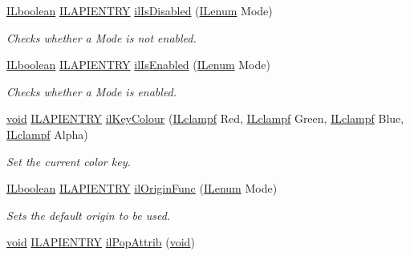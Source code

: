 \begin{DoxyCompactItemize}
\hyperlink{group__il__types_gaa6aa7c95cfdc06b4d8601ef832b7bb0a}{I\+Lboolean} \hyperlink{_i_l_8h_a69c08a8d06df986f7e46f209d131ef2f}{I\+L\+A\+P\+I\+E\+N\+T\+R\+Y} \hyperlink{group__state_ga6fdd0b1ac89f9a43bdb3be9a23cbe354}{il\+Is\+Disabled} (\hyperlink{group__il__types_ga62ca73445716183ef42b1f3906a45ed0}{I\+Lenum} Mode)
\begin{DoxyCompactList}\small\item\em Checks whether a {\itshape Mode} is not enabled. \end{DoxyCompactList}\item 
\hyperlink{group__il__types_gaa6aa7c95cfdc06b4d8601ef832b7bb0a}{I\+Lboolean} \hyperlink{_i_l_8h_a69c08a8d06df986f7e46f209d131ef2f}{I\+L\+A\+P\+I\+E\+N\+T\+R\+Y} \hyperlink{group__state_ga8f2fb1299fd1cf25c2a959aa3837cc48}{il\+Is\+Enabled} (\hyperlink{group__il__types_ga62ca73445716183ef42b1f3906a45ed0}{I\+Lenum} Mode)
\begin{DoxyCompactList}\small\item\em Checks whether a {\itshape Mode} is enabled. \end{DoxyCompactList}\item 
\hyperlink{_i_l_8h_a5530e04d947bcddd83639ea7940faf10}{void} \hyperlink{_i_l_8h_a69c08a8d06df986f7e46f209d131ef2f}{I\+L\+A\+P\+I\+E\+N\+T\+R\+Y} \hyperlink{group__state_gaf3c1ed8cef65fe9816a3c00486d94fd2}{il\+Key\+Colour} (\hyperlink{group__il__types_gae90d8075bf3ef2cd89c09b26fd4dbef2}{I\+Lclampf} Red, \hyperlink{group__il__types_gae90d8075bf3ef2cd89c09b26fd4dbef2}{I\+Lclampf} Green, \hyperlink{group__il__types_gae90d8075bf3ef2cd89c09b26fd4dbef2}{I\+Lclampf} Blue, \hyperlink{group__il__types_gae90d8075bf3ef2cd89c09b26fd4dbef2}{I\+Lclampf} Alpha)
\begin{DoxyCompactList}\small\item\em Set the current color key. \end{DoxyCompactList}\item 
\hyperlink{group__il__types_gaa6aa7c95cfdc06b4d8601ef832b7bb0a}{I\+Lboolean} \hyperlink{_i_l_8h_a69c08a8d06df986f7e46f209d131ef2f}{I\+L\+A\+P\+I\+E\+N\+T\+R\+Y} \hyperlink{group__state_gab518656efaed3f7ca95857e367e62ccd}{il\+Origin\+Func} (\hyperlink{group__il__types_ga62ca73445716183ef42b1f3906a45ed0}{I\+Lenum} Mode)
\begin{DoxyCompactList}\small\item\em Sets the default origin to be used. \end{DoxyCompactList}\item 
\hyperlink{_i_l_8h_a5530e04d947bcddd83639ea7940faf10}{void} \hyperlink{_i_l_8h_a69c08a8d06df986f7e46f209d131ef2f}{I\+L\+A\+P\+I\+E\+N\+T\+R\+Y} \hyperlink{group__state_gacc9ee35a9e48b55880655f6d143f39c1}{il\+Pop\+Attrib} (\hyperlink{_i_l_8h_a5530e04d947bcddd83639ea7940faf10}{void})

\end{DoxyCompactItemize}
